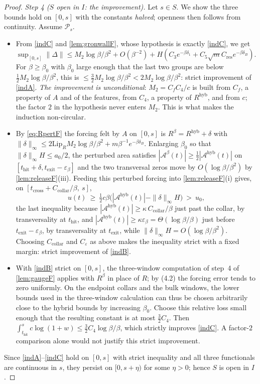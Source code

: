 \documentclass[11pt]{article}
\theoremstyle{definition}
\theoremstyle{remark}
\newcommand{\thit}{t_{\mathrm{hit}}}
\newcommand{\texit}{t_{\mathrm{exit}}}
\newcommand{\Ar}{\mathcal{A}}                      %
\newcommand{\hyb}{\mathrm{hyb}}
\newcommand{\tcross}{t_{\mathrm{cross}}}
\begin{document}
\begin{proof}
\emph{Step 4 ($S$ open in $I$: the improvement).} Let $s\in S$. We show the
three bounds hold on $[0,s]$ with the constants \emph{halved}; openness then
follows from continuity. Assume $\mathcal P_s$.
\begin{itemize}
\item[(4.1)] From \eqref{indC} and \cref{lem:gronwallF}, whose hypothesis is
exactly \eqref{indC}, we get
$\sup_{[0,s]}\|\Delta\|\le M_2\log\beta/\beta^2+O(\beta^{-2})+
H(C_3e^{-\beta\delta_1}+C_5\sqrt mC_{\mathrm{res}}e^{-\beta\delta_B})$. For
$\beta\ge\beta_0$ with $\beta_0$ large enough that the last two groups are below
$\tfrac12M_2\log\beta/\beta^2$, this is
$\le\tfrac32M_2\log\beta/\beta^2<2M_2\log\beta/\beta^2$: strict improvement of
\eqref{indA}. \emph{The improvement is unconditional}: $M_2=C_fC_4/c$ is built
from $C_f$, a property of $A$ and of the features, from $C_4$, a property of
$R^{\hyb}$, and from $c$; the factor $2$ in the hypothesis never enters $M_2$.
This is what makes the induction non-circular.
\item[(4.2)] By \eqref{eq:RpertF} the forcing felt by $A$ on $[0,s]$ is
$R^\beta=R^{\hyb}+\delta$ with
$\|\delta\|_\infty\le2\mathrm{Lip}_RM_2\log\beta/\beta^2
+m\beta^{-1}e^{-\beta\delta_B}$. Enlarging $\beta_0$ so that
$\|\delta\|_\infty H\le a_0/2$, the perturbed area satisfies
$|\Ar^\beta(t)|\ge\tfrac12|\Ar^{\hyb}(t)|$ on
$[\thit+\delta,\texit-\varepsilon_\beta]$ and the two transversal zeros move by
$O(\log\beta/\beta^2)$ by \cref{lem:releaseF}(iii). Feeding this perturbed
forcing into \cref{lem:releaseF}(i) gives, on
$[\tcross+C_{\mathrm{collar}}/\beta,\ s]$,
\[
u(t)\ \ge\ \tfrac12c\beta\bigl(|\Ar^{\hyb}(t)|-\|\delta\|_\infty H\bigr)\ >\ u_0 ,
\]
the last inequality because $|\Ar^{\hyb}(t)|\ge\kappa\,C_{\mathrm{collar}}/\beta$
just past the collar, by transversality at $\thit$, and
$|\Ar^{\hyb}(t)|\ge\kappa\varepsilon_\beta=\Theta(\log\beta/\beta)$ just before
$\texit-\varepsilon_\beta$, by transversality at $\texit$, while
$\|\delta\|_\infty H=O(\log\beta/\beta^2)$. Choosing $C_{\mathrm{collar}}$ and
$C_\varepsilon$ as above makes the inequality strict with a fixed margin: strict
improvement of \eqref{indB}.
\item[(4.3)] With \eqref{indB} strict on $[0,s]$, the three-window computation
of step~4 of \cref{lem:gaugeF} applies with $R^\beta$ in place of $R$; by (4.2)
the forcing error tends to zero uniformly. On the endpoint collars and the
bulk windows, the lower bounds used in the three-window calculation can thus
be chosen arbitrarily close to the hybrid bounds by increasing $\beta_0$.
Choose this relative loss small enough that the resulting constant is at most
$\tfrac32 C_4$. Then
$\int_{\thit}^{s}c\log(1+w)\le\tfrac32 C_4\log\beta/\beta$,
which strictly improves \eqref{indC}. A factor-$2$ comparison alone would not
justify this strict improvement.
\end{itemize}
Since \eqref{indA}--\eqref{indC} hold on $[0,s]$ with strict inequality and all
three functionals are continuous in $s$, they persist on $[0,s+\eta)$ for some
$\eta>0$; hence $S$ is open in $I$.


\end{proof}
\end{document}
